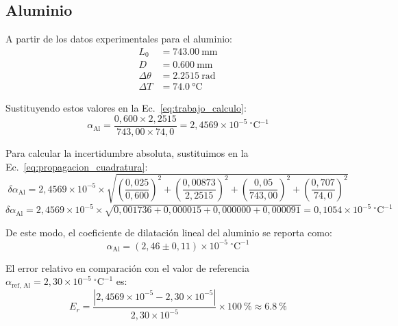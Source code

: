 \subsection{Aluminio}

A partir de los datos experimentales para el aluminio:
\begin{align*}
    L_0 &= \qty{743,00}{\milli\meter} \\
    D &= \qty{0,600}{\milli\meter} \\
    \Delta\theta &= \qty{2,2515}{\radian} \\
    \Delta T &= \qty{74,0}{\celsius}
\end{align*}

Sustituyendo estos valores en la Ec.~\eqref{eq:trabajo_calculo}:
\begin{equation*}
    \alpha_{\text{Al}} = \frac{0{,}600 \times 2{,}2515}{743{,}00 \times 74{,}0} = 2{,}4569 \times 10^{-5}\ ^\circ\text{C}^{-1}
\end{equation*}

Para calcular la incertidumbre absoluta, sustituimos en la Ec.~\eqref{eq:propagacion_cuadratura}:
\begin{equation*}
    \delta\alpha_{\text{Al}} = 2{,}4569 \times 10^{-5} \times \sqrt{
        \left(\frac{0{,}025}{0{,}600}\right)^2 +
        \left(\frac{0{,}00873}{2{,}2515}\right)^2 +
        \left(\frac{0{,}05}{743{,}00}\right)^2 +
        \left(\frac{0{,}707}{74{,}0}\right)^2
    }
\end{equation*}
\begin{equation*}
    \delta\alpha_{\text{Al}} = 2{,}4569 \times 10^{-5} \times \sqrt{
        0{,}001736 + 0{,}000015 + 0{,}000000 + 0{,}000091
    } = 0{,}1054 \times 10^{-5}\ ^\circ\text{C}^{-1}
\end{equation*} 

De este modo, el coeficiente de dilatación lineal del aluminio se reporta como:
\begin{equation}
    \alpha_{\text{Al}} = (2{,}46 \pm 0{,}11) \times 10^{-5}\ ^\circ\text{C}^{-1}
    \label{eq:res_al}
\end{equation}

El error relativo en comparación con el valor de referencia $\alpha_{\text{ref, Al}} = 2{,}30 \times 10^{-5}\ ^\circ\text{C}^{-1}$ es:
\begin{equation*}
    E_r = \frac{|2{,}4569 \times 10^{-5} - 2{,}30 \times 10^{-5}|}{2{,}30 \times 10^{-5}} \times \qty{100}{\percent} \approx \qty{6,8}{\percent}
\end{equation*}

